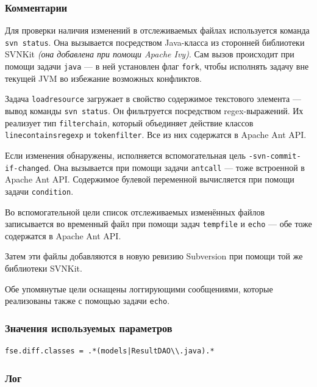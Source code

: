 \subsubsection{Комментарии}

Для проверки наличия изменений в отслеживаемых файлах используется команда \texttt{svn status}. Она вызывается посредством Java-класса из сторонней библиотеки SVNKit \textit{(она добавлена при помощи Apache Ivy)}. Сам вызов происходит при помощи задачи \texttt{java} --- в ней установлен флаг \texttt{fork}, чтобы исполнять задачу вне текущей JVM во избежание возможных конфликтов.

Задача \texttt{loadresource} загружает в свойство содержимое текстового элемента --- вывод команды \texttt{svn status}. Он фильтруется посредством regex-выражений. Их реализует тип \texttt{filterchain}, который объединяет действие классов \texttt{linecontainsregexp} и \texttt{tokenfilter}. Все из них содержатся в Apache Ant API.

Если изменения обнаружены, исполняется вспомогательная цель \texttt{-svn-commit-if-changed}. Она вызывается при помощи задачи \texttt{antcall} --- тоже встроенной в Apache Ant API. Содержимое булевой переменной вычисляется при помощи задачи \texttt{condition}.

Во вспомогательной цели список отслеживаемых изменённых файлов записывается во временный файл при помощи задач \texttt{tempfile} и \texttt{echo} --- обе тоже содержатся в Apache Ant API.

Затем эти файлы добавляются в новую ревизию Subversion при помощи той же библиотеки SVNKit.

Обе упомянутые цели оснащены логгирующими сообщениями, которые реализованы также с помощью задачи \texttt{echo}.

\subsubsection{Значения используемых параметров}

\begin{lstlisting}[language=Properties,caption={Часть содержимого файла \texttt{build.properties}},captionpos=b]
fse.diff.classes = .*(models|ResultDAO\\.java).*
\end{lstlisting}

\subsubsection{Лог}

